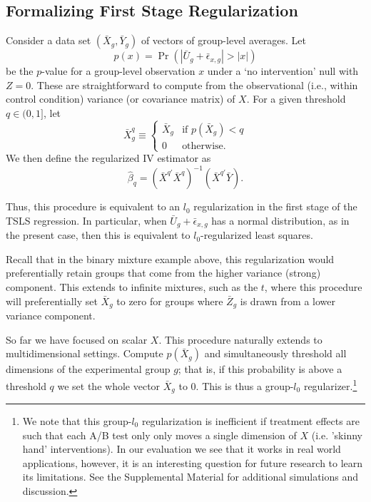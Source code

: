 \documentclass{article}
\begin{document}
\subsection{Formalizing First Stage Regularization}
Consider a data set $(\bar{X}_g, \bar{Y}_g)$ of vectors of group-level averages.
Let
$$
p(x) = \Pr(|\bar{U}_g + \bar{\epsilon}_{x,g}| > |x|)
$$
be the $p$-value for a group-level observation $x$ under a `no intervention' null with $Z = 0$. These are straightforward to compute from the observational (i.e., within control condition) variance (or covariance matrix) of $X$.
For a given threshold $q \in (0,1]$, let 
$$
\bar{X}^q_g \equiv
\begin{cases}
   \bar{X}_g& \text{if } p(\bar{X}_g) < q\\
    0              & \text{otherwise}.
\end{cases}$$
We then define the regularized IV estimator as
$$\hat{\beta}_q = (\bar{X}^{q'} {\bar{X}}^q)^{-1} (\bar{X}^{q'} \bar{Y}).$$



Thus, this procedure is equivalent to an $l_0$ regularization in the first stage of the TSLS regression. In particular, when $\bar{U}_g + \bar{\epsilon}_{x,g}$ has a normal distribution, as in the present case, then this is equivalent to $l_0$-regularized least squares.

Recall that in the binary mixture example above, this regularization would preferentially retain groups that come from the higher variance (strong) component. This extends to infinite mixtures, such as the $t$, where this procedure will preferentially set $\bar{X}_g$ to zero for groups where $\bar{Z}_g$ is drawn from a lower variance component.

So far we have focused on scalar $X$. This procedure naturally extends to multidimensional settings. Compute $p(\bar{X}_g)$ and simultaneously threshold all dimensions of the experimental group $g$; that is, if this probability is above a threshold $q$ we set the whole vector $\bar{X}_g$ to $0.$ This is thus a group-$l_0$ regularizer.\footnote{
We note that this group-$l_0$ regularization is inefficient if treatment effects are such that each A/B test only only moves a single dimension of $X$ (i.e. 'skinny hand' interventions). In our evaluation we see that it works in real world applications, however, it is an interesting question for future research to learn its limitations. See the Supplemental Material for additional simulations and discussion.}
\end{document}
